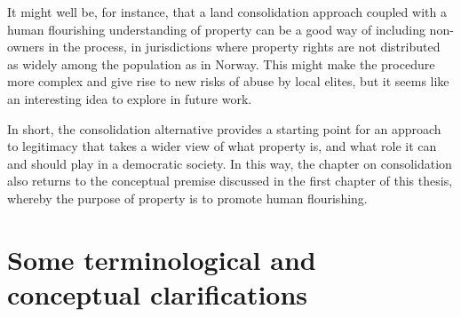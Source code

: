 It might well be, for instance, that a land consolidation approach coupled with a human flourishing understanding of property can be a good way of including non-owners in the process, in jurisdictions where property rights are not distributed as widely among the population as in Norway. This might make the procedure more complex and give rise to new risks of abuse by local elites, but it seems like an interesting idea to explore in future work. 

In short, the consolidation alternative provides a starting point for an approach to legitimacy that takes a wider view of what property is, and what role it can and should play in a democratic society. In this way, the chapter on consolidation also returns to the conceptual premise discussed in the first chapter of this thesis, whereby the purpose of property is to promote human flourishing.


\section{Some terminological and conceptual clarifications}


